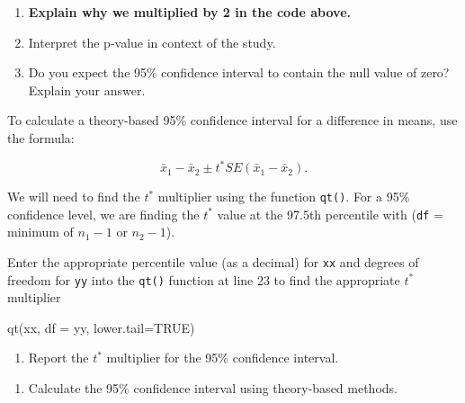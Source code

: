 \documentclass[
]{report}
\newenvironment{Shaded}{\begin{snugshade}}{\end{snugshade}}
\newcommand{\AttributeTok}[1]{\textcolor[rgb]{0.77,0.63,0.00}{#1}}
\newcommand{\ConstantTok}[1]{\textcolor[rgb]{0.00,0.00,0.00}{#1}}
\newcommand{\FunctionTok}[1]{\textcolor[rgb]{0.00,0.00,0.00}{#1}}
\newcommand{\NormalTok}[1]{#1}
\providecommand{\tightlist}{%
  \setlength{\itemsep}{0pt}\setlength{\parskip}{0pt}}
\begin{document}
\begin{enumerate}
\def\labelenumi{\arabic{enumi}.}
\setcounter{enumi}{10}
\item
  \textbf{Explain why we multiplied by 2 in the code above.}
  \vspace{0.3in}
\item
  Interpret the p-value in context of the study.
  \vspace{0.8in}
\item
  Do you expect the 95\% confidence interval to contain the null value of zero? Explain your answer.
  \vspace{0.8in}
\end{enumerate}

To calculate a theory-based 95\% confidence interval for a difference in means, use the formula:

\[\bar{x}_1- \bar{x}_2\pm t^* SE(\bar{x}_1- \bar{x}_2).\]

We will need to find the \(t^*\) multiplier using the function \texttt{qt()}. For a 95\% confidence level, we are finding the \(t^*\) value at the 97.5th percentile with (\texttt{df} = minimum of \(n_1 - 1\) or \(n_2 - 1\)).

Enter the appropriate percentile value (as a decimal) for \texttt{xx} and degrees of freedom for \texttt{yy} into the \texttt{qt()} function at line 23 to find the appropriate \(t^*\) multiplier

\begin{Shaded}
\begin{Highlighting}[]
\FunctionTok{qt}\NormalTok{(xx, }\AttributeTok{df =}\NormalTok{ yy, }\AttributeTok{lower.tail=}\ConstantTok{TRUE}\NormalTok{)}
\end{Highlighting}
\end{Shaded}

\begin{enumerate}
\def\labelenumi{\arabic{enumi}.}
\setcounter{enumi}{13}
\tightlist
\item
  Report the \(t^*\) multiplier for the 95\% confidence interval.
\end{enumerate}

\newpage

\begin{enumerate}
\def\labelenumi{\arabic{enumi}.}
\setcounter{enumi}{14}
\tightlist
\item
  Calculate the 95\% confidence interval using theory-based methods.
\end{enumerate}

\vspace{1in}
\end{document}
